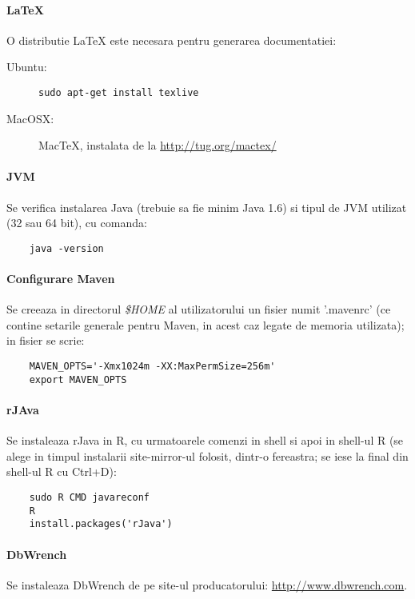 \paragraph{LaTeX}
O distributie LaTeX este necesara pentru generarea documentatiei:
\begin{description}
\item[Ubuntu:] 
\begin{lstlisting}[breaklines=true]
	sudo apt-get install texlive
\end{lstlisting}
\item[MacOSX:] MacTeX, instalata de la \url{http://tug.org/mactex/} 
\end{description}

\paragraph{JVM}
\label{java_version}
Se verifica instalarea Java (trebuie sa fie minim Java 1.6) si tipul de JVM
utilizat (32 sau 64 bit), cu comanda:
\begin{lstlisting}
	java -version
\end{lstlisting}

\paragraph{Configurare Maven}
Se creeaza in directorul \emph{\$HOME} al utilizatorului un fisier numit
'.mavenrc' 
(ce contine setarile generale pentru Maven, in acest caz legate de memoria utilizata);
in fisier se scrie:
\begin{lstlisting}
	MAVEN_OPTS='-Xmx1024m -XX:MaxPermSize=256m'
	export MAVEN_OPTS
\end{lstlisting}

\paragraph{rJAva}
Se instaleaza rJava in R, cu urmatoarele comenzi in shell si apoi in shell-ul R
(se alege in timpul instalarii site-mirror-ul folosit, dintr-o fereastra;
se iese la final din shell-ul R cu Ctrl+D):
\begin{lstlisting}
	sudo R CMD javareconf
	R
	install.packages('rJava')
\end{lstlisting}

\paragraph{DbWrench}
Se instaleaza DbWrench de pe site-ul producatorului:
\url{http://www.dbwrench.com}.


